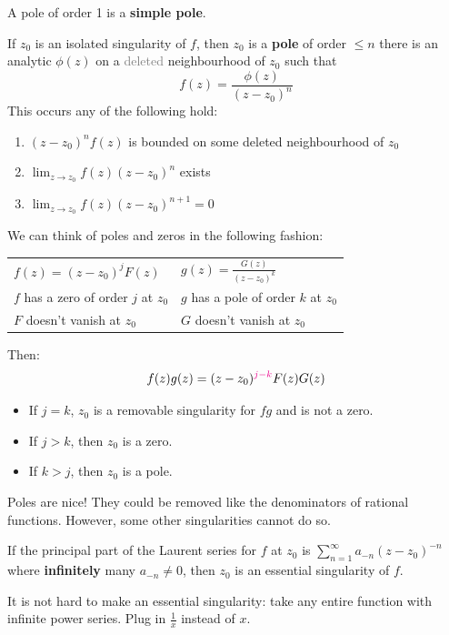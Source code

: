 \documentclass[12pt]{article}
\begin{document}
 A pole of order 1 is a \textbf{simple pole}.

\begin{theorem}
    If $z_0$ is an isolated singularity of $f$, then $z_0$ is a \textbf{pole} of order $\leq n$ \ifnif there is an analytic $\phi(z)$ on a \textcolor{gray}{deleted} neighbourhood of $z_0$ such that \[f(z)=\frac{\phi(z)}{(z-z_0)^n}\]
    This occurs \ifnif any of the following hold: \begin{enumerate}[label=(\alph*)]
        \item $(z-z_0)^nf(z)$ is bounded on some deleted neighbourhood of $z_0$
        \item $\lim_{z\to z_0}f(z)(z-z_0)^n$ exists
        \item $\lim_{z\to z_0}f(z)(z-z_0)^{n+1}=0$
    \end{enumerate}
\end{theorem}

\rmk We can think of poles and zeros in the following fashion: 

\begin{tabular}{ll}
   $f(z)=(z-z_0)^jF(z)$ & $g(z) = \frac{G(z)}{(z-z_0)^k}$\\
   $f$ has a zero of order $j$ at $z_0$ & $g$ has a pole of order $k$ at $z_0$\\
   $F$ doesn't vanish at $z_0$ & $G$ doesn't vanish at $z_0$
\end{tabular}
Then: \[f(z)g(z)=(z-z_0)^{\textcolor{magenta}{j-k}}F(z)G(z)\]
\begin{itemize}
    \item If $j=k$, $z_0$ is a removable singularity for $fg$ and is not a zero.
    \item If $j>k$, then $z_0$ is a zero.
    \item If $k>j$, then $z_0$ is a pole.
\end{itemize}

Poles are nice! They could be removed like the denominators of rational functions. However, some other singularities cannot do so.

 If the principal part of the Laurent series for $f$ at $z_0$ is $\sum_{n=1}^{\infty}a_{-n}(z-z_0)^{-n}$ where \textbf{infinitely} many $a_{-n}\neq 0$, then $z_0$ is an essential singularity of $f$.

\rmk It is not hard to make an essential singularity: take any entire function with infinite power series. Plug in $\frac{1}{x}$ instead of $x$.
\end{document}
